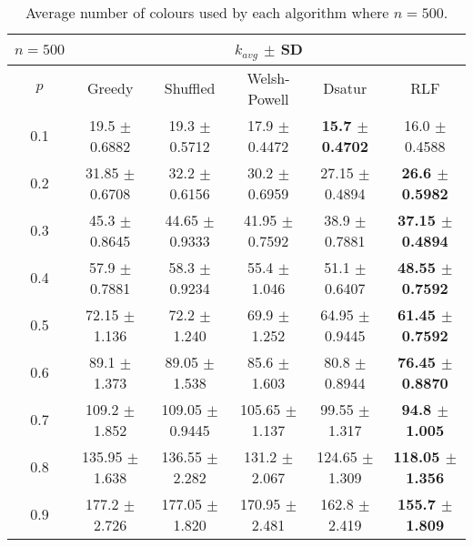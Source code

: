 \begin{table}[H]
    \centering
    \begin{tabular}{cccccc}
        
        $n = 500$& \multicolumn{5}{c}{$k_{avg}$ $\pm$ SD} \\
        \hline
        $p$ & Greedy & Shuffled & Welsh-Powell & Dsatur & RLF \\
        \hline
         0.1 & 19.5 $\pm$ 0.6882 & 19.3 $\pm$ 0.5712 & 17.9 $\pm$ 0.4472 & \textbf{15.7 $\pm$ 0.4702} & 16.0 $\pm$ 0.4588 \\
        0.2 & 31.85 $\pm$ 0.6708 & 32.2 $\pm$ 0.6156 & 30.2 $\pm$ 0.6959 & 27.15 $\pm$ 0.4894 & \textbf{26.6 $\pm$ 0.5982} \\
        0.3 & 45.3 $\pm$ 0.8645 & 44.65 $\pm$ 0.9333 & 41.95 $\pm$ 0.7592 & 38.9 $\pm$ 0.7881 & \textbf{37.15 $\pm$ 0.4894} \\
        0.4 & 57.9 $\pm$ 0.7881 & 58.3 $\pm$ 0.9234 & 55.4 $\pm$ 1.046 & 51.1 $\pm$ 0.6407 & \textbf{48.55 $\pm$ 0.7592} \\
        0.5 & 72.15 $\pm$ 1.136 & 72.2 $\pm$ 1.240 & 69.9 $\pm$ 1.252 & 64.95 $\pm$ 0.9445 & \textbf{61.45 $\pm$ 0.7592} \\
        0.6 & 89.1 $\pm$ 1.373 & 89.05 $\pm$ 1.538 & 85.6 $\pm$ 1.603 & 80.8 $\pm$ 0.8944 & \textbf{76.45 $\pm$ 0.8870} \\
        0.7 & 109.2 $\pm$ 1.852 & 109.05 $\pm$ 0.9445 & 105.65 $\pm$ 1.137 & 99.55 $\pm$ 1.317 & \textbf{94.8 $\pm$ 1.005} \\
        0.8 & 135.95 $\pm$ 1.638 & 136.55 $\pm$ 2.282 & 131.2 $\pm$ 2.067 & 124.65 $\pm$ 1.309 & \textbf{118.05 $\pm$ 1.356} \\
        0.9 & 177.2 $\pm$ 2.726 & 177.05 $\pm$ 1.820 & 170.95 $\pm$ 2.481 & 162.8 $\pm$ 2.419 & \textbf{155.7 $\pm$ 1.809} \\
        \hline
    \end{tabular}
    \caption{Average number of colours used by each algorithm where $n = 500$.}
    \label{tab:avgKforV500}
\end{table}

